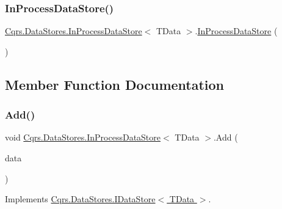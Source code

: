 \subsubsection{\texorpdfstring{In\+Process\+Data\+Store()}{InProcessDataStore()}}
{\footnotesize\ttfamily \hyperlink{classCqrs_1_1DataStores_1_1InProcessDataStore}{Cqrs.\+Data\+Stores.\+In\+Process\+Data\+Store}$<$ T\+Data $>$.\hyperlink{classCqrs_1_1DataStores_1_1InProcessDataStore}{In\+Process\+Data\+Store} (\begin{DoxyParamCaption}{ }\end{DoxyParamCaption})}



\subsection{Member Function Documentation}
\mbox{\label{classCqrs_1_1DataStores_1_1InProcessDataStore_ade5c4033c628598665c0cba986a54c15_ade5c4033c628598665c0cba986a54c15}} 
\subsubsection{\texorpdfstring{Add()}{Add()}\hspace{0.1cm}{\footnotesize\ttfamily [1/2]}}
{\footnotesize\ttfamily void \hyperlink{classCqrs_1_1DataStores_1_1InProcessDataStore}{Cqrs.\+Data\+Stores.\+In\+Process\+Data\+Store}$<$ T\+Data $>$.Add (\begin{DoxyParamCaption}\item[{T\+Data}]{data }\end{DoxyParamCaption})}



Implements \hyperlink{interfaceCqrs_1_1DataStores_1_1IDataStore_a114404daaf37fec9cc5547cd9a17858c_a114404daaf37fec9cc5547cd9a17858c}{Cqrs.\+Data\+Stores.\+I\+Data\+Store$<$ T\+Data $>$}.

\mbox{\label{classCqrs_1_1DataStores_1_1InProcessDataStore_ad62504e478f0a907c18ec4aa9b42703a_ad62504e478f0a907c18ec4aa9b42703a}} 
